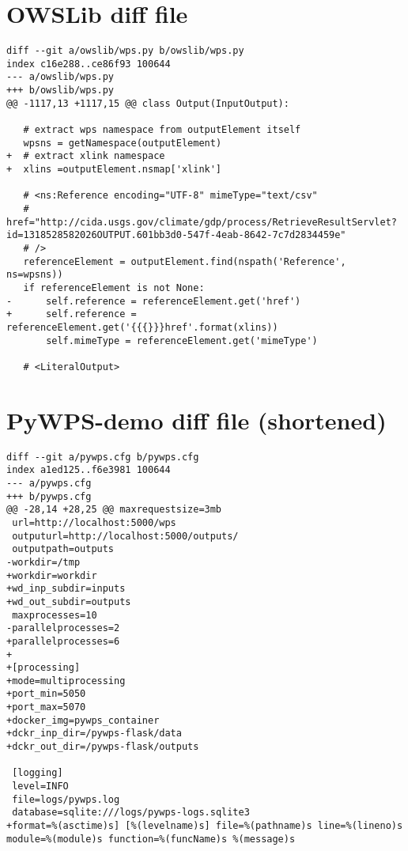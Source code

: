 \section{OWSLib diff file}
\label{app:owslib}
\begin{lstlisting}[basicstyle=\small,caption={OWSLib diff file}]
diff --git a/owslib/wps.py b/owslib/wps.py
index c16e288..ce86f93 100644
--- a/owslib/wps.py
+++ b/owslib/wps.py
@@ -1117,13 +1117,15 @@ class Output(InputOutput):
 
   # extract wps namespace from outputElement itself
   wpsns = getNamespace(outputElement)
+  # extract xlink namespace
+  xlins =outputElement.nsmap['xlink']
 
   # <ns:Reference encoding="UTF-8" mimeType="text/csv"
   # href="http://cida.usgs.gov/climate/gdp/process/RetrieveResultServlet?id=1318528582026OUTPUT.601bb3d0-547f-4eab-8642-7c7d2834459e"
   # />
   referenceElement = outputElement.find(nspath('Reference', ns=wpsns))
   if referenceElement is not None:
-      self.reference = referenceElement.get('href')
+      self.reference = referenceElement.get('{{{}}}href'.format(xlins))
       self.mimeType = referenceElement.get('mimeType')
 
   # <LiteralOutput>
\end{lstlisting}

\newpage
\section{PyWPS-demo diff file (shortened)}
\label{app:pywps-demo}
\begin{lstlisting}[basicstyle=\small,caption={pywps-demo diff file}]
diff --git a/pywps.cfg b/pywps.cfg
index a1ed125..f6e3981 100644
--- a/pywps.cfg
+++ b/pywps.cfg
@@ -28,14 +28,25 @@ maxrequestsize=3mb
 url=http://localhost:5000/wps
 outputurl=http://localhost:5000/outputs/
 outputpath=outputs
-workdir=/tmp
+workdir=workdir
+wd_inp_subdir=inputs
+wd_out_subdir=outputs
 maxprocesses=10
-parallelprocesses=2
+parallelprocesses=6
+
+[processing]
+mode=multiprocessing
+port_min=5050
+port_max=5070
+docker_img=pywps_container
+dckr_inp_dir=/pywps-flask/data
+dckr_out_dir=/pywps-flask/outputs
 
 [logging]
 level=INFO
 file=logs/pywps.log
 database=sqlite:///logs/pywps-logs.sqlite3
+format=%(asctime)s] [%(levelname)s] file=%(pathname)s line=%(lineno)s module=%(module)s function=%(funcName)s %(message)s
\end{lstlisting}

\newpage
